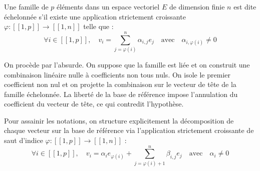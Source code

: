 \documentclass[11pt, a4paper]{article}
\theoremstyle{definition}
\begin{document}
\begin{rappel}
	Une famille de $p$ éléments dans un espace vectoriel $E$ de dimension finie $n$ est dite échelonnée s'il existe une application strictement croissante $\varphi : [\![1, p]\!] \to [\![1, n]\!]$ telle que :
	\[\forall i \in [\![1, p]\!], \quad v_i = \sum_{j=\varphi(i)}^n \alpha_{i,j} e_j \quad \text{avec} \quad \alpha_{i,\varphi(i)} \neq 0\]
\end{rappel}

\begin{tcolorbox}[methodstyle]
	On procède par l'absurde. On suppose que la famille est liée et on construit une combinaison linéaire nulle à coefficients non tous nuls. On isole le premier coefficient non nul et on projette la combinaison sur le vecteur de tête de la famille échelonnée. La liberté de la base de référence impose l'annulation du coefficient du vecteur de tête, ce qui contredit l'hypothèse.
\end{tcolorbox}

Pour assainir les notations, on structure explicitement la décomposition de chaque vecteur sur la base de référence via l'application strictement croissante de saut d'indice $\varphi : [\![1, p]\!] \to [\![1, n]\!]$ :
\[
\forall i \in [\![1, p]\!], \quad v_i = \alpha_i e_{\varphi(i)} + \sum_{j=\varphi(i)+1}^n \beta_{i,j} e_j \quad \text{avec} \quad \alpha_i \neq 0
\]
\end{document}

